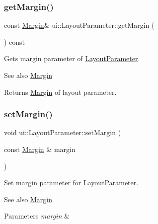 \subsubsection{\texorpdfstring{get\+Margin()}{getMargin()}\hspace{0.1cm}{\footnotesize\ttfamily [2/2]}}
{\footnotesize\ttfamily const \hyperlink{classui_1_1Margin}{Margin}\& ui\+::\+Layout\+Parameter\+::get\+Margin (\begin{DoxyParamCaption}{ }\end{DoxyParamCaption}) const}

Gets margin parameter of \hyperlink{classui_1_1LayoutParameter}{Layout\+Parameter}.

\begin{DoxySeeAlso}{See also}
\hyperlink{classui_1_1Margin}{Margin} 
\end{DoxySeeAlso}
\begin{DoxyReturn}{Returns}
\hyperlink{classui_1_1Margin}{Margin} of layout parameter. 
\end{DoxyReturn}
\mbox{\label{classui_1_1LayoutParameter_a0e0d2968dee143c8545365a12e45e586}} 
\subsubsection{\texorpdfstring{set\+Margin()}{setMargin()}\hspace{0.1cm}{\footnotesize\ttfamily [1/2]}}
{\footnotesize\ttfamily void ui\+::\+Layout\+Parameter\+::set\+Margin (\begin{DoxyParamCaption}\item[{const \hyperlink{classui_1_1Margin}{Margin} \&}]{margin }\end{DoxyParamCaption})}

Set margin parameter for \hyperlink{classui_1_1LayoutParameter}{Layout\+Parameter}.

\begin{DoxySeeAlso}{See also}
\hyperlink{classui_1_1Margin}{Margin} 
\end{DoxySeeAlso}

\begin{DoxyParams}{Parameters}
{\em margin} & \\
\hline
\end{DoxyParams}
\mbox{\label{classui_1_1LayoutParameter_a0e0d2968dee143c8545365a12e45e586}} 
